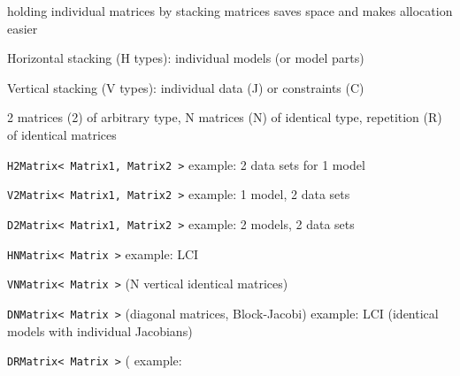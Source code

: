 holding individual matrices by stacking matrices saves space and makes allocation easier

Horizontal stacking (H types): individual models (or model parts)

Vertical stacking (V types): individual data (J) or constraints (C)

2 matrices (2) of arbitrary type, N matrices (N) of identical type, repetition (R) of identical matrices

\lstinline|H2Matrix< Matrix1, Matrix2 >|
example: 2 data sets for 1 model

\lstinline|V2Matrix< Matrix1, Matrix2 >| example: 1 model, 2 data sets

\lstinline|D2Matrix< Matrix1, Matrix2 >| example: 2 models, 2 data sets

\lstinline|HNMatrix< Matrix >| example: LCI 

\lstinline|VNMatrix< Matrix >| (N vertical identical matrices)

\lstinline|DNMatrix< Matrix >| (diagonal matrices, Block-Jacobi)
example: LCI (identical models with individual Jacobians)

\lstinline|DRMatrix< Matrix >| (
example: 